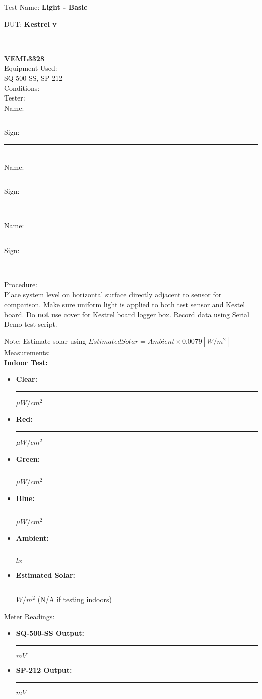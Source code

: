 \setlength\parindent{0pt}

\noindent
{\Huge Test Name: \textbf{Light - Basic}}\\[20pt]
{\Large DUT: \textbf{Kestrel v}\rule{1cm}{0.15mm}}\\ \textbf{VEML3328} \\[10pt]
{\Large Equipment Used: }\\[10pt]SQ-500-SS, SP-212\\[40pt]
{\Large Conditions: }\\[40pt]
{\Large Tester: }\\[10pt]
Name: \rule{4cm}{0.15mm} \hfill Sign: \rule{4cm}{0.15mm}\\[5pt]
Name: \rule{4cm}{0.15mm} \hfill Sign: \rule{4cm}{0.15mm}\\[5pt]
Name: \rule{4cm}{0.15mm} \hfill Sign: \rule{4cm}{0.15mm}\\[15pt]
{\Large Procedure: }\\
Place system level on horizontal surface directly adjacent to sensor for comparison. Make sure uniform light is applied to both test sensor and Kestel board. Do \textbf{not} use cover for Kestrel board logger box. Record data using Serial Demo test script.

Note: Estimate solar using $Estimated Solar = Ambient \times 0.0079 [W/m^2]$
\\[5pt]
{\Large Measurements: }\\
{\Large \textbf{Indoor Test:} }\\
\begin{itemize}
\item \textbf{Clear:} \rule{2cm}{0.15mm} $\mu W/cm^2$
\item \textbf{Red:} \rule{2cm}{0.15mm} $\mu W/cm^2$
\item \textbf{Green:} \rule{2cm}{0.15mm} $\mu W/cm^2$
\item \textbf{Blue:} \rule{2cm}{0.15mm} $\mu W/cm^2$
\item \textbf{Ambient:} \rule{2cm}{0.15mm} $lx$
\item \textbf{Estimated Solar:} \rule{2cm}{0.15mm} $W/m^2$ (N/A if testing indoors)
\end{itemize}
{\Large Meter Readings: }\\
\begin{itemize}
\item \textbf{SQ-500-SS Output:} \rule{2cm}{0.15mm} $mV$
\item \textbf{SP-212 Output:} \rule{2cm}{0.15mm} $mV$
\end{itemize}

